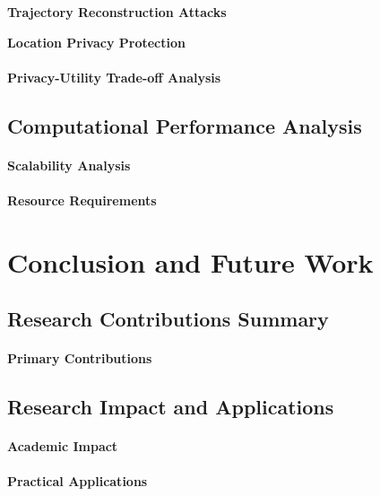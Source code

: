 \documentclass[runningheads]{llncs}
\begin{document}
\textbf{Trajectory Reconstruction Attacks}

\textbf{Location Privacy Protection}

\paragraph{Privacy-Utility Trade-off Analysis}

\subsection{Computational Performance Analysis}
\label{sec:performance}

\paragraph{Scalability Analysis}

\paragraph{Resource Requirements}

\section{Conclusion and Future Work}
\label{sec:conclusion}

\subsection{Research Contributions Summary}

\paragraph{Primary Contributions}

\subsection{Research Impact and Applications}

\paragraph{Academic Impact}

\paragraph{Practical Applications}
\end{document}
